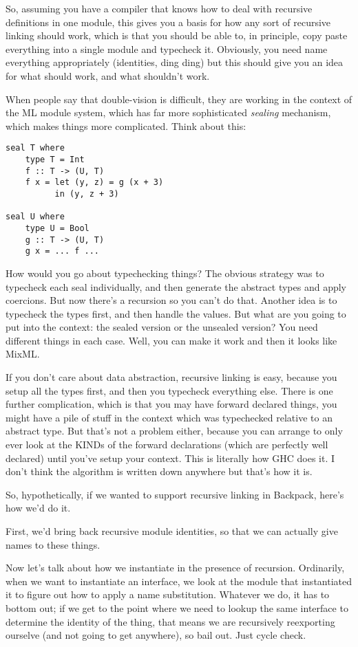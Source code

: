 So, assuming you have a compiler that knows how to deal with recursive
definitions in one module, this gives you a basis for how any sort
of recursive linking should work, which is that you should be able to,
in principle, copy paste everything into a single module and typecheck it.
Obviously, you need name everything appropriately (identities, ding ding)
but this should give you an idea for what should work, and what shouldn't work.

When people say that double-vision is difficult, they are working in the
context of the ML module system, which has far more sophisticated \emph{sealing}
mechanism, which makes things more complicated.  Think about this:

\begin{verbatim}
seal T where
    type T = Int
    f :: T -> (U, T)
    f x = let (y, z) = g (x + 3)
          in (y, z + 3)

seal U where
    type U = Bool
    g :: T -> (U, T)
    g x = ... f ...
\end{verbatim}

How would you go about typechecking things?  The obvious strategy was to typecheck
each seal individually, and then generate the abstract types and apply coercions.
But now there's a recursion so you can't do that.  Another idea is to typecheck
the types first, and then handle the values.  But what are you going to put into
the context: the sealed version or the unsealed version? You need different things
in each case. Well, you can make it work and then it looks like MixML\@.

If you don't care about data abstraction, recursive linking is easy, because you
setup all the types first, and then you typecheck everything else.  There is one
further complication, which is that you may have forward declared things, you might
have a pile of stuff in the context which was typechecked relative to an abstract
type.  But that's not a problem either, because you can arrange to only ever look at
the KINDs of the forward declarations (which are perfectly well declared) until
you've setup your context.  This is literally how GHC does it.  I don't think the
algorithm is written down anywhere but that's how it is.


So, hypothetically, if we wanted to support recursive linking in Backpack,
here's how we'd do it.

First, we'd bring back recursive module identities, so that we can actually
give names to these things.

Now let's talk about how we instantiate in the presence of recursion.
Ordinarily, when we want to instantiate an interface, we look at the
module that instantiated it to figure out how to apply a name substitution.
Whatever we do, it has to bottom out; if we get to the point where we need
to lookup the same interface to determine the identity of the thing, that means
we are recursively reexporting ourselve (and not going to get anywhere), so
bail out.  Just cycle check.

